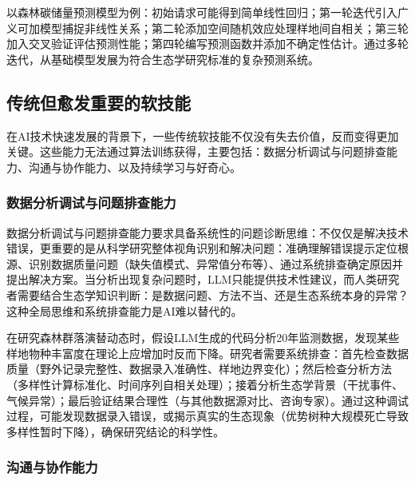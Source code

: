 \documentclass[
  twoside,12pt,fontset=none]{ctexbook}
\begin{document}
以森林碳储量预测模型为例：初始请求可能得到简单线性回归；第一轮迭代引入广义可加模型捕捉非线性关系；第二轮添加空间随机效应处理样地间自相关；第三轮加入交叉验证评估预测性能；第四轮编写预测函数并添加不确定性估计。通过多轮迭代，从基础模型发展为符合生态学研究标准的复杂预测系统。

\hypertarget{ux4f20ux7edfux4f46ux6108ux53d1ux91cdux8981ux7684ux8f6fux6280ux80fd}{%
\subsection{传统但愈发重要的软技能}\label{ux4f20ux7edfux4f46ux6108ux53d1ux91cdux8981ux7684ux8f6fux6280ux80fd}}

在AI技术快速发展的背景下，一些传统软技能不仅没有失去价值，反而变得更加关键。这些能力无法通过算法训练获得，主要包括：数据分析调试与问题排查能力、沟通与协作能力、以及持续学习与好奇心。

\hypertarget{ux6570ux636eux5206ux6790ux8c03ux8bd5ux4e0eux95eeux9898ux6392ux67e5ux80fdux529b}{%
\subsubsection{数据分析调试与问题排查能力}\label{ux6570ux636eux5206ux6790ux8c03ux8bd5ux4e0eux95eeux9898ux6392ux67e5ux80fdux529b}}

数据分析调试与问题排查能力要求具备系统性的问题诊断思维：不仅仅是解决技术错误，更重要的是从科学研究整体视角识别和解决问题：准确理解错误提示定位根源、识别数据质量问题（缺失值模式、异常值分布等）、通过系统排查确定原因并提出解决方案。当分析出现复杂问题时，LLM只能提供技术性建议，而人类研究者需要结合生态学知识判断：是数据问题、方法不当、还是生态系统本身的异常？这种全局思维和系统排查能力是AI难以替代的。

在研究森林群落演替动态时，假设LLM生成的代码分析20年监测数据，发现某些样地物种丰富度在理论上应增加时反而下降。研究者需要系统排查：首先检查数据质量（野外记录完整性、数据录入准确性、样地边界变化）；然后检查分析方法（多样性计算标准化、时间序列自相关处理）；接着分析生态学背景（干扰事件、气候异常）；最后验证结果合理性（与其他数据源对比、咨询专家）。通过这种调试过程，可能发现数据录入错误，或揭示真实的生态现象（优势树种大规模死亡导致多样性暂时下降），确保研究结论的科学性。

\hypertarget{ux6c9fux901aux4e0eux534fux4f5cux80fdux529b}{%
\subsubsection{沟通与协作能力}\label{ux6c9fux901aux4e0eux534fux4f5cux80fdux529b}}
\end{document}
